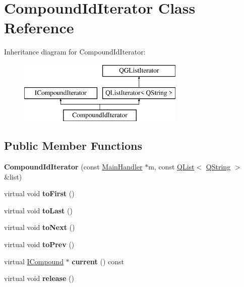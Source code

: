 \hypertarget{class_compound_id_iterator}{}\section{Compound\+Id\+Iterator Class Reference}
\label{class_compound_id_iterator}
Inheritance diagram for Compound\+Id\+Iterator\+:\begin{figure}[H]
\begin{center}
\leavevmode
\includegraphics[height=3.000000cm]{class_compound_id_iterator}
\end{center}
\end{figure}
\subsection*{Public Member Functions}
\begin{DoxyCompactItemize}
\item 
\mbox{\label{class_compound_id_iterator_aa1152215516fdf215ede1b19204d17ba}} 
{\bfseries Compound\+Id\+Iterator} (const \mbox{\hyperlink{class_main_handler}{Main\+Handler}} $\ast$m, const \mbox{\hyperlink{class_q_list}{Q\+List}}$<$ \mbox{\hyperlink{class_q_string}{Q\+String}} $>$ \&list)
\item 
\mbox{\label{class_compound_id_iterator_aa5a023c4b2b80ea1482471670906e6f2}} 
virtual void {\bfseries to\+First} ()
\item 
\mbox{\label{class_compound_id_iterator_ac0b023226257444051756a2a5f78e42c}} 
virtual void {\bfseries to\+Last} ()
\item 
\mbox{\label{class_compound_id_iterator_a1707e98108f1acadd96bdfcc16311779}} 
virtual void {\bfseries to\+Next} ()
\item 
\mbox{\label{class_compound_id_iterator_affc7e21f97fa4015d967a3db7bc43793}} 
virtual void {\bfseries to\+Prev} ()
\item 
\mbox{\label{class_compound_id_iterator_a5af63c6a80d76847979da80d5c8f785a}} 
virtual \mbox{\hyperlink{class_i_compound}{I\+Compound}} $\ast$ {\bfseries current} () const
\item 
\mbox{\label{class_compound_id_iterator_a19bee3dbe9c27b62cadeffa7448c1f15}} 
virtual void {\bfseries release} ()
\end{DoxyCompactItemize}
